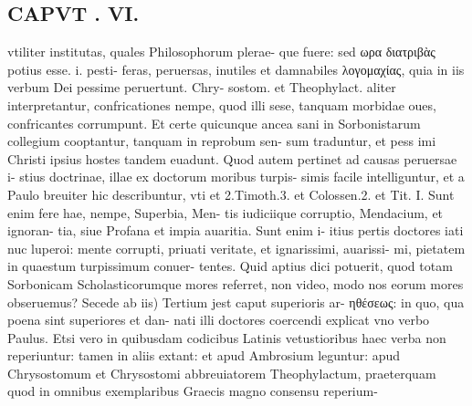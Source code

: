 \documentclass{article}
\begin{document}
\begin{pages}
\section*{CAPVT . VI. }
\marginpar{[ p.429 ]}\pstart vtiliter institutas, quales Philosophorum plerae- que fuere: sed ωρα διατριβὰς potius esse. i. pesti- feras, peruersas, inutiles et damnabiles λογομαχίας, quia in iis verbum Dei pessime peruertunt. Chry- sostom. et Theophylact. aliter interpretantur, confricationes nempe, quod illi sese, tanquam morbidae oues, confricantes corrumpunt. Et certe quicunque ancea sani in Sorbonistarum collegium cooptantur, tanquam in reprobum sen- sum traduntur, et pess imi Christi ipsius hostes tandem euadunt.  \pend\pstart Quod autem pertinet ad causas peruersae i- stius doctrinae, illae ex doctorum moribus turpis- simis facile intelliguntur, et a Paulo breuiter hic describuntur, vti et 2.Timoth.3. et Colossen.2. et Tit. I. Sunt enim fere hae, nempe, Superbia, Men- tis iudiciique corruptio, Mendacium, et ignoran- tia, siue Profana et impia auaritia. Sunt enim i- itius pertis doctores iati nuc luperoi: mente corrupti, priuati veritate, et ignarissimi, auarissi- mi, pietatem in quaestum turpissimum conuer- tentes. Quid aptius dici potuerit, quod totam Sorbonicam Scholasticorumque  mores referret, non video, modo nos eorum mores obseruemus?  \pend\pstart Secede ab iis) Tertium jest caput superioris ar- ηθέσεως: in quo, qua poena sint superiores et dan- nati illi doctores coercendi explicat vno verbo Paulus. Etsi vero in quibusdam codicibus Latinis vetustioribus haec verba non reperiuntur: tamen in aliis extant: et apud Ambrosium leguntur: apud Chrysostomum et Chrysostomi abbreuiatorem Theophylactum, praeterquam quod in omnibus exemplaribus Graecis magno consensu reperium-  \pend

\end{pages}
\end{document}
